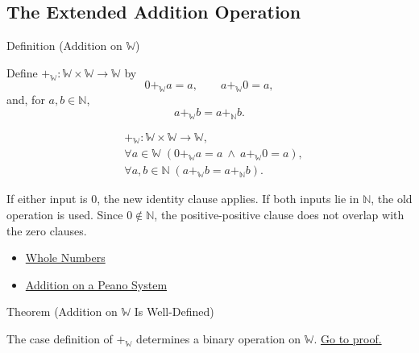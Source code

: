 \subsection*{The Extended Addition Operation}

\begin{definitionbox}{Definition (Addition on \texorpdfstring{$\mathbb{W}$}{W})}
\begin{definition}
\label{def:addition-on-w}
Define $+_{\mathbb{W}}:\mathbb{W}\times\mathbb{W}\to\mathbb{W}$ by
\[
0+_{\mathbb{W}}a=a,\qquad
a+_{\mathbb{W}}0=a,
\]
and, for $a,b\in\mathbb{N}$,
\[
a+_{\mathbb{W}}b=a+_{\mathbb{N}}b.
\]
\end{definition}
\end{definitionbox}

\begin{remark*}
\[
\begin{aligned}
&+_{\mathbb{W}}:\mathbb{W}\times\mathbb{W}\to\mathbb{W},\\
&\forall a\in\mathbb{W}\;(0+_{\mathbb{W}}a=a\ \wedge\ a+_{\mathbb{W}}0=a),\\
&\forall a,b\in\mathbb{N}\;
  (a+_{\mathbb{W}}b=a+_{\mathbb{N}}b).
\end{aligned}
\]
\end{remark*}

\begin{remark*}[Interpretation]
If either input is $0$, the new identity clause applies. If both inputs lie in
$\mathbb{N}$, the old operation is used. Since $0\notin\mathbb{N}$, the
positive-positive clause does not overlap with the zero clauses.
\end{remark*}

\begin{dependencies}
\begin{itemize}
  \item \hyperref[def:whole-numbers]{Whole Numbers}
  \item \hyperref[def:addition-on-peano-system]{Addition on a Peano System}
\end{itemize}
\end{dependencies}

\begin{theorembox}{Theorem (Addition on \texorpdfstring{$\mathbb{W}$}{W} Is Well-Defined)}
\begin{theorem}
\label{thm:addition-on-w-well-defined}
The case definition of $+_{\mathbb{W}}$ determines a binary operation on
$\mathbb{W}$.
\hyperref[prf:addition-on-w-well-defined]{Go to proof.}
\end{theorem}
\end{theorembox}

